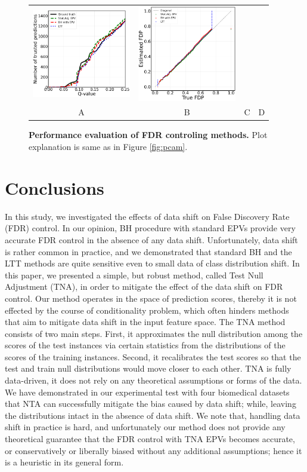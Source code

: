 \documentclass{article}
\begin{document}
\begin{figure}[h!]
\begin{tabular}{cccc}
        \includegraphics[width=1.7in]{img/cnn_chx_fdr_control_loc.png} & 
        \includegraphics[width=1.7in]{img/cnn_FDPscat_chx.png}\\
		A & B & C & D
	\end{tabular}
	\caption{{\bf Performance evaluation of FDR controling methods.} Plot explanation is same as in Figure \ref{fig:pcam}. }
	\label{fig:bcss}
\end{figure} 

\section{Conclusions}

In this study, we investigated the effects of data shift on False Discovery Rate (FDR) control. In our opinion, BH procedure with standard EPVs provide very accurate FDR control in the absence of any data shift. Unfortunately, data shift is rather common in practice, and we demonstrated that standard BH and the LTT methods are quite sensitive even to small data of class distribution shift. In this paper, we presented a simple, but robust method, called Test Null Adjustment (TNA), in order to mitigate the effect of the data shift on FDR control. Our method operates in the space of prediction scores, thereby it is not effected by the course of conditionality problem, which often hinders methods that aim to mitigate data shift in the input feature space. The TNA method consists of two main steps. First, it approximates the null distribution among the scores of the test instances via certain statistics from the distributions of the scores of the training instances. Second, it recalibrates the test scores so that the test and train null distributions would move closer to each other. TNA is fully data-driven, it does not rely on any theoretical assumptions or forms of the data. We have demonstrated in our experimental test with four biomedical datasets that NTA can successfully mitigate the bias caused by data shift; while, leaving the distributions intact in the absence of data shift. We note that, handling data shift in practice is hard, and unfortunately our method does not provide any theoretical guarantee that the FDR control with TNA EPVs becomes accurate, or conservatively or liberally biased without any additional assumptions; hence it is a heuristic in its general form.  
\end{document}
